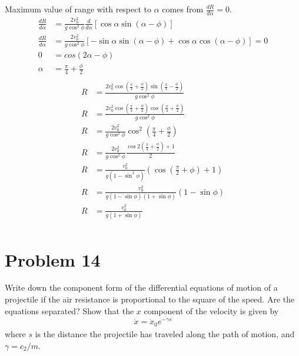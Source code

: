 \documentclass[]{article}
\begin{document}
	Maximum value of range with respect to $ \alpha $ comes from $ \frac{dR}{d\alpha} = 0 $.
	\begin{equation}
		\begin{split}
			\frac{dR}{d\alpha} &= \frac{2v_0^2}{g \cos^2 \phi} \frac{d}{d\alpha} \left[ \cos \alpha \sin (\alpha - \phi) \right] \\
			\frac{dR}{d\alpha} &= \frac{2v_0^2}{g \cos^2 \phi} \left[ -\sin \alpha \sin (\alpha - \phi) + \cos \alpha \cos (\alpha - \phi) \right] = 0 \\
			0 &= cos(2\alpha - \phi) \\
			\alpha &= \frac{\pi}{4} + \frac{\phi}{2} \\
		\end{split}
	\end{equation}
	\begin{equation}
		\begin{split}
			R &= \frac{2 v_0^2 \cos (\frac{\pi}{4} + \frac{\phi}{2}) \sin (\frac{\pi}{4} - \frac{\phi}{2})}{g \cos^2 \phi} \\
			R &= \frac{2 v_0^2 \cos (\frac{\pi}{4} + \frac{\phi}{2}) \cos (\frac{\pi}{4} + \frac{\phi}{2})}{g \cos^2 \phi} \\
			R &= \frac{2 v_0^2}{g \cos^2 \phi} \cos^2 (\frac{\pi}{4} + \frac{\phi}{2}) \\
			R &= \frac{2 v_0^2}{g \cos^2 \phi} \frac{\cos 2(\frac{\pi}{4} + \frac{\phi}{2}) + 1 }{2}  \\
			R &= \frac{v_0^2}{g(1 - \sin^2 \phi)} (\cos (\frac{\pi}{2} + \phi) + 1) \\
			R &= \frac{v_0^2}{g(1 - \sin \phi)(1 + \sin \phi)} (1 - \sin \phi) \\
			R &= \frac{v_0^2}{g(1 + \sin \phi)} \\
		\end{split}
	\end{equation}

	\section{Problem 14}
	
	Write down the component form of the differential equations of motion of a projectile if the air resistance is proportional to the square of the speed. Are the equations separated? Show that the $ x $ component of the velocity is given by
	\begin{equation}
		\begin{split}
			\dot{x} = \dot{x}_0 e^{-\gamma s}
		\end{split}
	\end{equation}
	where $ s $ is the distance the projectile has traveled along the path of motion, and $ \gamma = c_2 / m $. \\
	
\end{document}
